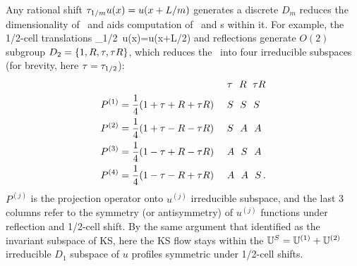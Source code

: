 Any rational shift $ \tau_{1/m}u(x)=u(x+L/m)$ generates a discrete
$D_m$ reduces the dimensionality of \statesp\ and aids computation of
\eqva\ and \po s within it. For example, the 1/2-cell translations \beq
    \Shift_{1/2}\, u(x)=u(x+L/2)
and reflections generate $O(2)$
subgroup $D_2 = \{1, \Refl,\Shift,\Shift\Refl\}$,
which
reduces the \statesp\ into four irreducible subspaces
(for brevity, here $\Shift = \Shift_{1/2}$):
\begin{align}
 & \qquad\qquad\qquad\qquad\qquad
              ~~~ \Shift ~~ \Refl  ~\;  \Shift\Refl
    \nnu\\
P^{(1)} &= \frac{1}{4} (1 + \Shift + \Refl + \Shift\Refl)
           ~~~~  S  ~~  S   ~~   S
    \nnu\\
P^{(2)} &= \frac{1}{4} (1 + \Shift - \Refl - \Shift\Refl)
            ~~~~  S  ~~  A   ~~   A
    \nnu\\
P^{(3)} &= \frac{1}{4} (1 - \Shift + \Refl - \Shift\Refl)
           ~~~~  A  ~~  S   ~~   A
     \label{ek_defn}\\
P^{(4)} &= \frac{1}{4} (1 - \Shift - \Refl + \Shift\Refl)
          ~~~~  A  ~~  A   ~~   S
\,.
    \nnu
\end{align}
$P^{(j)}$ is the projection operator onto
$u^{(j)}$ irreducible subspace, and the last 3 columns
refer to the symmetry (or antisymmetry) of
$u^{(j)}$ functions under reflection and
1/2-cell shift.
By the same argument that identified  as
the invariant subspace of KS, here the KS flow
stays within the
 $\mathbb{U}^S =  \mathbb{U}^{(1)}+ \mathbb{U}^{(2)}$
irreducible $D_1$ subspace of
$u$ profiles symmetric under 1/2-cell shifts.

